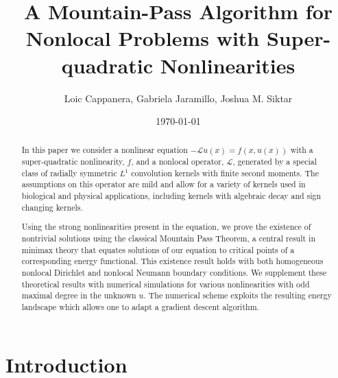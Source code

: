 \documentclass[11pt]{amsart}   	%
\title{A Mountain-Pass Algorithm for Nonlocal Problems with Super-quadratic Nonlinearities}
\author{Loic Cappanera, Gabriela Jaramillo, Joshua M. Siktar}
\date{\today}							%
\theoremstyle{plain}
\numberwithin{equation}{section}
\def\Lin{\mathcal{L}}
\newcommand{\GJ}[1]{{\color{red} {\bf Gabriela:} [#1] }}
\begin{document}
\begin{abstract}




 In this paper we consider a nonlinear equation $-\Lin u(x) = f(x, u(x))$ with a super-quadratic nonlinearity, $f$, and a nonlocal operator, $\Lin$, generated by a special class of radially symmetric $L^1$ convolution kernels with finite second moments. The assumptions on this operator are mild and allow for a variety of kernels used in biological and physical applications, including kernels with algebraic decay and sign changing kernels. 
   
    Using the strong nonlinearities present in the equation, we prove the existence of nontrivial solutions using the classical Mountain Pass Theorem, a central result in minimax theory that equates solutions of our equation to critical points of a corresponding energy functional. This existence result holds with both homogeneous nonlocal Dirichlet and nonlocal Neumann boundary conditions. We supplement these theoretical results with numerical simulations for various nonlinearities with odd maximal degree in the unknown $u$. The numerical scheme exploits the resulting energy landscape which allows one to adapt a gradient descent algorithm.
\end{abstract}

\maketitle

\section{Introduction}
\end{document}
